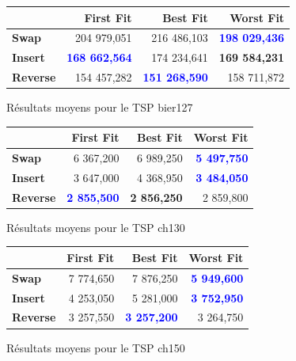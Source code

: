 \documentclass[a4paper,10pt]{report}
\begin{document}
\begin{figure}[h]
  \begin{center}
    \begin{tabular}{|l|r|r|r|}
      \hline
      &		\textbf{First Fit}&	\textbf{Best Fit}&	\textbf{Worst
Fit}\\\hline
      \textbf{Swap}&
	  204 979,051&
	  216 486,103&
	  \textbf{\textcolor{blue}{198 029,436}}\\\hline
      \textbf{Insert}&
	  \textbf{\textcolor{blue}{168 662,564}}&
	  174 234,641&
	  \textbf{169 584,231}\\\hline
      \textbf{Reverse}&
	  154 457,282&
	  \textbf{\textcolor{blue}{151 268,590}}&
	  158 711,872\\\hline
    \end{tabular}
    \caption{Résultats moyens pour le TSP bier127}
  \end{center}
\end{figure}

\begin{figure}[ht]
  \begin{center}
    \begin{tabular}{|l|r|r|r|}
      \hline
      &		\textbf{First Fit}&	\textbf{Best Fit}&	\textbf{Worst
Fit}\\\hline
      \textbf{Swap}&
	  6 367,200&
	  6 989,250&
	  \textbf{\textcolor{blue}{5 497,750}}\\\hline
      \textbf{Insert}&
	  3 647,000&
	  4 368,950&
	  \textbf{\textcolor{blue}{3 484,050}}\\\hline
      \textbf{Reverse}&
	  \textbf{\textcolor{blue}{2 855,500}}&
	  \textbf{2 856,250}&
	  2 859,800\\\hline
    \end{tabular}
    \caption{Résultats moyens pour le TSP ch130}
  \end{center}
\end{figure}

\begin{figure}[h]
  \begin{center}
    \begin{tabular}{|l|r|r|r|}
      \hline
      &		\textbf{First Fit}&	\textbf{Best Fit}&	\textbf{Worst
Fit}\\\hline
      \textbf{Swap}&
	  7 774,650&
	  7 876,250&
	  \textbf{\textcolor{blue}{5 949,600}}\\\hline
      \textbf{Insert}&
	  4 253,050&
	  5 281,000&
	  \textbf{\textcolor{blue}{3 752,950}}\\\hline
      \textbf{Reverse}&
	  3 257,550&
	  \textbf{\textcolor{blue}{3 257,200}}&
	  3 264,750\\\hline
    \end{tabular}
    \caption{Résultats moyens pour le TSP ch150}
  \end{center}
\end{figure}
\end{document}
